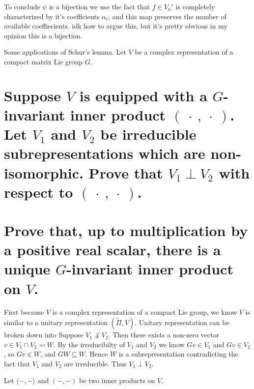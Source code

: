 \documentclass[
	pages,
	boxes,
	color=WildStrawberry
]{homework}
\begin{document}
\begin{solution}
	To conclude $\psi$ is a bijection we use the fact that $f\in V_n'$ is completely characterized by it's coefficients $\alpha_i$, and this map preserves the number of available coeffiecients. idk how to argue this, but it's pretty obvious in my opinion this is a bijection.

\end{solution}

\begin{problem}
Some applications of Schur's lemma. Let $V$ be a complex representation of a compact matrix Lie group $G$.
\begin{parts}
	\part{Suppose $V$ is equipped with a $G$-invariant inner product $(\ \cdot\ , \ \cdot\ )$. Let $V_1$ and $V_2$ be irreducible subrepresentations which are non-isomorphic. Prove that $V_1 \perp V_2$ with respect to $(\ \cdot\ , \ \cdot\ )$.}\label{part:6a}
	\part{Prove that, up to multiplication by a positive real scalar, there is a unique $G$-invariant inner product on $V$.}\label{part:6b}
\end{parts}
\end{problem}

\begin{solution}
	\ref{part:6a}
	First because $V$ is a complex representation of a compact Lie group, we know $V$ is similar to a unitary representation $(\tilde{\Pi}, V)$. Unitary representation can be broken down into
	Suppose $V_1\not\perp V_2$. Then there exists a non-zero vector $v\in V_1\cap V_2 \eqqcolon W$. By the irreducibilty of $V_1$ and $V_2$ we know $Gv\in V_1$ and $Gv\in V_2$, so $Gv\in W$, and $GW\subseteq W$. Hence $W$ is a subrepresentation contradicting the fact that $V_1$ and $V_2$ are irreducible. Thus $V_1\perp V_2$.

	\ref{part:6b}
	Let $\langle-,-\rangle$ and $(-, -)$ be two inner products on $V$.
\end{solution}
\end{document}
